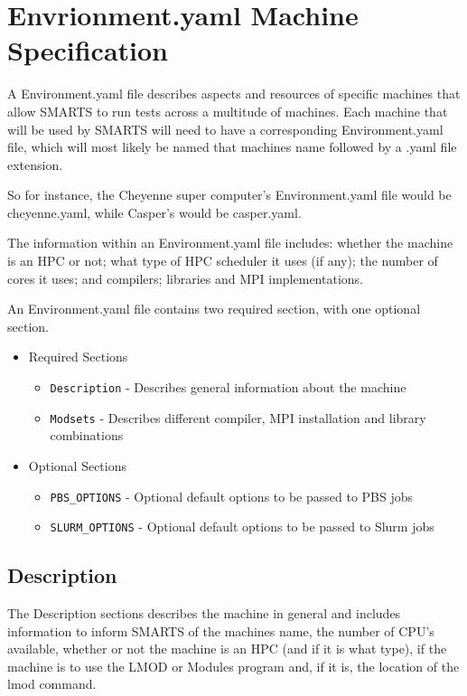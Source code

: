  \chapter{Envrionment.yaml Machine Specification}
 \label{chap:environment_file_spec}

A Environment.yaml file describes aspects and resources of specific machines
that allow SMARTS to run tests across a multitude of machines. Each machine
that will be used by SMARTS will need to have a corresponding Environment.yaml
file, which will most likely be named that machines name followed by a .yaml
file extension.

So for instance, the Cheyenne super computer's Environment.yaml file would be
cheyenne.yaml, while Casper's would be casper.yaml.

The information within an Environment.yaml file includes: whether the machine
is an HPC or not; what type of HPC scheduler it uses (if any); the number of
cores it uses; and compilers; libraries and MPI implementations.

An Environment.yaml file contains two required section, with one optional
section.

\begin{itemize}
\item Required Sections
    \begin{itemize}
        \item {\tt Description} - Describes general information about the machine
        \item {\tt Modsets} - Describes different compiler, MPI installation and library combinations
    \end{itemize}
\item Optional Sections
    \begin{itemize}
        \item {\tt PBS\_OPTIONS} - Optional default options to be passed to PBS jobs
        \item {\tt SLURM\_OPTIONS} - Optional default options to be passed to Slurm jobs
    \end{itemize}
\end{itemize}

\section{Description}
\label{section:description}

The Description sections describes the machine in general and includes
information to inform SMARTS of the machines name, the number of CPU's
available, whether or not the machine is an HPC (and if it is what type), if
the machine is to use the LMOD or Modules program and, if it is, the location
of the lmod command.

